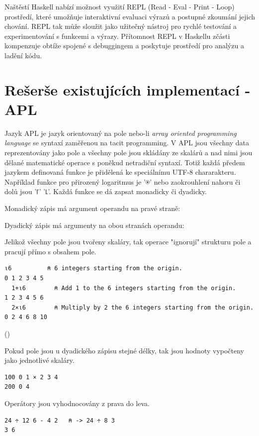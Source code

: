 \documentclass[male,czech]{kithesis}
\newcommand{\aplInline}[1]{\colorbox{gray!10}{{\apl{#1}}}}
\begin{document}
Naštěstí Haskell nabízí možnost využití REPL 
(Read - Eval - Print - Loop) prostředí, 
které umožňuje interaktivní evaluaci výrazů a postupné zkoumání jejich chování. 
REPL tak může sloužit jako užitečný nástroj pro rychlé testování 
a experimentování s funkcemi a výrazy. 
Přítomnost REPL v Haskellu zčásti kompenzuje obtíže spojené 
s debuggingem a poskytuje prostředí pro analýzu a ladění kódu.

\section{Rešerše existujících implementací - APL}

Jazyk APL je jazyk orientovaný na pole nebo-li \textit{array oriented programming language} se 
syntaxí zaměřenou na tacit programming. V APL jsou všechny data reprezentovány jako pole 
a všechny pole jsou skládány ze skalárů a nad 
nimi jsou dělané matematické operace s poněkud netradiční syntaxí. Totiž každá 
předem jazykem definovaná funkce je přidělená ke speciálnímu UTF-8 chararakteru. 
Například funkce pro přirozený logaritmus je {\apl '⍟'} nebo zaokrouhlení nahoru či dolů 
jsou {\apl '⌈' '⌊'}.
Každá funkce se dá zapsat monadicky či dyadicky. 

Monadický zápis má argument operandu na pravé straně:
\aplInline{-5    ⍝ monadic}

Dyadický zápis má argumenty na obou stranách operandu:
\aplInline{10-7  ⍝ dyadic}

Jelikož všechny pole jsou tvořeny skaláry, tak operace "ignorují" strukturu pole a pracují přímo 
s obsahem pole.

\begin{lstlisting}[language=apl,extendedchars=true]
  ⍳6          ⍝ 6 integers starting from the origin.
0 1 2 3 4 5
  1+⍳6        ⍝ Add 1 to the 6 integers starting from the origin.
1 2 3 4 5 6
  2×⍳6        ⍝ Multiply by 2 the 6 integers starting from the origin.
0 2 4 6 8 10
\end{lstlisting} 
(\cite{WhyAPLIsWorthKnowing})

Pokud pole jsou u dyadického zápisu stejné délky, tak jsou hodnoty vypočteny jako jednotlivé 
skaláry.

\begin{lstlisting}[language=apl,extendedchars=true]
  100 0 1 × 2 3 4
200 0 4
\end{lstlisting}

Operátory jsou vyhodnocovány z prava do leva.

\begin{lstlisting}[language=apl,extendedchars=true]
  24 ÷ 12 6 - 4 2   ⍝ -> 24 ÷ 8 3
3 6
\end{lstlisting}
\end{document}
